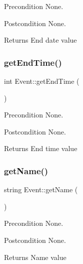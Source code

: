 \begin{DoxyPrecond}{Precondition}
None. 
\end{DoxyPrecond}
\begin{DoxyPostcond}{Postcondition}
None. 
\end{DoxyPostcond}
\begin{DoxyReturn}{Returns}
End date value 
\end{DoxyReturn}
\hypertarget{class_event_a15cc6c49faa82aea991deec2f6230c64}{}\label{class_event_a15cc6c49faa82aea991deec2f6230c64} 
\subsubsection{\texorpdfstring{get\+End\+Time()}{getEndTime()}}
{\footnotesize\ttfamily int Event\+::get\+End\+Time (\begin{DoxyParamCaption}{ }\end{DoxyParamCaption})}

\begin{DoxyPrecond}{Precondition}
None. 
\end{DoxyPrecond}
\begin{DoxyPostcond}{Postcondition}
None. 
\end{DoxyPostcond}
\begin{DoxyReturn}{Returns}
End time value 
\end{DoxyReturn}
\hypertarget{class_event_a6be6a0033ddac703543dc5d1040dd9b8}{}\label{class_event_a6be6a0033ddac703543dc5d1040dd9b8} 
\subsubsection{\texorpdfstring{get\+Name()}{getName()}}
{\footnotesize\ttfamily string Event\+::get\+Name (\begin{DoxyParamCaption}{ }\end{DoxyParamCaption})}

\begin{DoxyPrecond}{Precondition}
None. 
\end{DoxyPrecond}
\begin{DoxyPostcond}{Postcondition}
None. 
\end{DoxyPostcond}
\begin{DoxyReturn}{Returns}
Name value 
\end{DoxyReturn}
\hypertarget{class_event_a204b0907d17225fd3394dbc413ef6b25}{}\label{class_event_a204b0907d17225fd3394dbc413ef6b25} 
